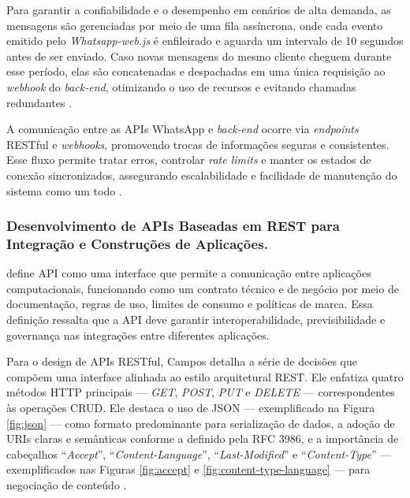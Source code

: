 Para garantir a confiabilidade e o desempenho em cenários de alta demanda, as mensagens são gerenciadas por meio de uma fila assíncrona, onde cada evento emitido pelo \textit{Whatsapp-web.js} é enfileirado e aguarda um intervalo de 10 segundos antes de ser enviado. Caso novas mensagens do mesmo cliente cheguem durante esse período, elas são concatenadas e despachadas em uma única requisição ao \textit{webhook} do \textit{back‑end}, otimizando o uso de recursos e evitando chamadas redundantes \cite{dias2024}. 

A comunicação entre as APIs WhatsApp e \textit{back‑end} ocorre via \textit{endpoints} RESTful e \textit{webhooks}, promovendo trocas de informações seguras e consistentes. Esse fluxo permite tratar erros, controlar \textit{rate limits} e manter os estados de conexão sincronizados, assegurando escalabilidade e facilidade de manutenção do sistema como um todo \cite{dias2024}.

\subsubsection{Desenvolvimento de APIs Baseadas em REST para Integração e
Construções de Aplicações.}

\cite{campos2013} define API como uma interface que permite a comunicação entre aplicações computacionais, funcionando como um contrato técnico e de negócio por meio de documentação, regras de uso, limites de consumo e políticas de marca. Essa definição ressalta que a API deve garantir interoperabilidade, previsibilidade e governança nas integrações entre diferentes aplicações.

Para o design de APIs RESTful, Campos detalha a série de decisões que compõem uma interface alinhada ao estilo arquitetural REST. Ele enfatiza quatro métodos HTTP principais — \textit{GET}, \textit{POST}, \textit{PUT} e \textit{DELETE} — correspondentes às operações CRUD. Ele destaca o uso de JSON — exemplificado na Figura \ref{fig:json} — como formato predominante para serialização de dados, a adoção de URIs claras e semânticas conforme a definido pela RFC 3986, e a importância de cabeçalhos “\textit{Accept}”, “\textit{Content-Language}”, “\textit{Last-Modified}” e “\textit{Content-Type}” — exemplificados nas Figuras \ref{fig:accept} e \ref{fig:content-type-language} — para negociação de conteúdo \cite{campos2013}.

